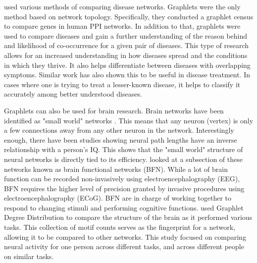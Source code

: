 \documentclass[12pt,twoside]{reedthesis}
\begin{document}
\citeauthor{bio_disease} \cite{bio_disease} used various methods of comparing disease networks. Graphlets were the only method based on network topology. Specifically, they conducted a graphlet census to compare genes in human PPI networks. In addition to that, graphlets were used to compare diseases and gain a further understanding of the reason behind and likelihood of co-occurrence for a given pair of diseases. This type of research allows for an increased understanding in how diseases spread and the conditions in which they thrive. It also helps differentiate between diseases with overlapping symptoms. Similar work has also shown this to be useful in disease treatment. In cases where one is trying to treat a lesser-known disease, it helps to classify it accurately among better understood diseases.

Graphlets can also be used for brain research. Brain networks have been identified as "small world" networks \cite{bio_graphlets}. This means that any neuron (vertex) is only a few connections away from any other neuron in the network. Interestingly enough, there have been studies showing neural path lengths have an inverse relationship with a person's IQ. This shows that the "small world" structure of neural networks is directly tied to its efficiency. \citeauthor{bio_brain} looked at a subsection of these networks known as brain functional networks (BFN). While a lot of brain function can be recorded non-invasively using electroencephalography (EEG), BFN requires the higher level of precision granted by invasive procedures using electroencephalography (ECoG). BFN are in charge of working together to respond to changing stimuli and performing cognitive functions. \citeauthor{bio_brain} \cite{bio_brain} used Graphlet Degree Distribution to compare the structure of the brain as it performed various tasks. This collection of motif counts serves as the fingerprint for a network, allowing it to be compared to other networks. This study focused on comparing neural activity for one person across different tasks, and across different people on similar tasks.






\end{document}
